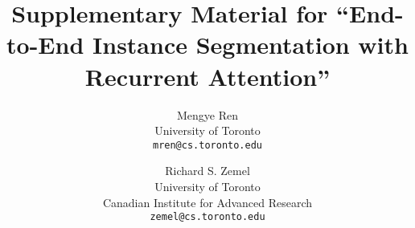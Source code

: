 \documentclass[10pt,twocolumn,letterpaper]{article}
\renewcommand{\*}[1]{\textbf{#1}}               %
\begin{document}
\title{Supplementary Material for ``End-to-End Instance Segmentation with Recurrent Attention''}

\author{
    Mengye Ren \\
    University of Toronto \\
    {\tt \small mren@cs.toronto.edu} \\
    \and
    Richard S. Zemel \\
    University of Toronto \\
    Canadian Institute for Advanced Research \\
    {\tt \small zemel@cs.toronto.edu} \\
}

\maketitle


\end{document}
